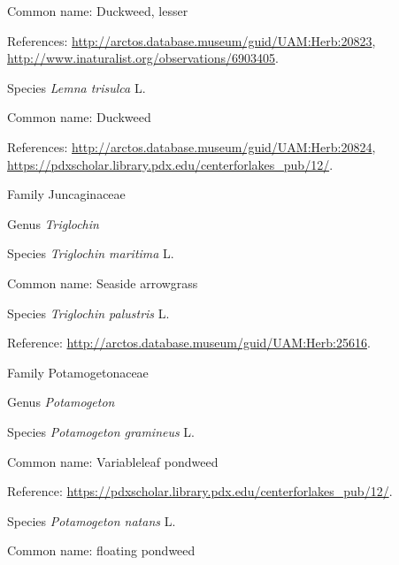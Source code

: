 \documentclass[9pt, article]{memoir}
\begin{document}
\begin{multicols}{2}
Common name: Duckweed, lesser

References: 
\url{http://arctos.database.museum/guid/UAM:Herb:20823}, 
\url{http://www.inaturalist.org/observations/6903405}.

\vspace{6pt}\noindent\hspace{36pt}Species \textit{Lemna trisulca} L.


Common name: Duckweed

References: 
\url{http://arctos.database.museum/guid/UAM:Herb:20824}, 
\url{https://pdxscholar.library.pdx.edu/centerforlakes_pub/12/}.

\vspace{6pt}\noindent\hspace{24pt}Family Juncaginaceae


\vspace{6pt}\noindent\hspace{30pt}Genus \textit{Triglochin}


\vspace{6pt}\noindent\hspace{36pt}Species \textit{Triglochin maritima} L.


Common name: Seaside arrowgrass

\vspace{6pt}\noindent\hspace{36pt}Species \textit{Triglochin palustris} L.


Reference: 
\url{http://arctos.database.museum/guid/UAM:Herb:25616}.

\vspace{6pt}\noindent\hspace{24pt}Family Potamogetonaceae


\vspace{6pt}\noindent\hspace{30pt}Genus \textit{Potamogeton}


\vspace{6pt}\noindent\hspace{36pt}Species \textit{Potamogeton gramineus} L.


Common name: Variableleaf pondweed

Reference: 
\url{https://pdxscholar.library.pdx.edu/centerforlakes_pub/12/}.

\vspace{6pt}\noindent\hspace{36pt}Species \textit{Potamogeton natans} L.


Common name: floating pondweed


\end{multicols}
\end{document}
